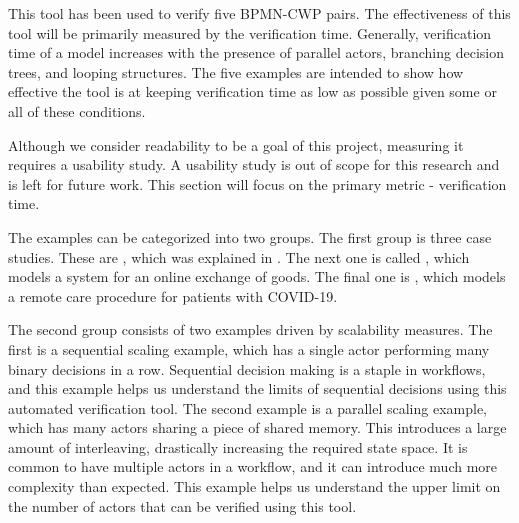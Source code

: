 This tool has been used to verify five BPMN-CWP pairs. The effectiveness of this tool will be primarily measured by the verification time. Generally, verification time of a model increases with the presence of parallel actors, branching decision trees, and looping structures. The five examples are intended to show how effective the tool is at keeping verification time as low as possible given some or all of these conditions.
 
Although we consider readability to be a goal of this project, measuring it requires a usability study. A usability study is out of scope for this research and is left for future work. This section will focus on the primary metric - verification time.

The examples can be categorized into two groups. The first group is three case studies. These are \facetoface, which was explained in . The next one is called \buynsell, which models a system for an online exchange of goods. The final one is \phware, which models a remote care procedure for patients with COVID-19.

The second group consists of two examples driven by scalability measures. The first is a sequential scaling example, which has a single actor performing many binary decisions in a row. Sequential decision making is a staple in workflows, and this example helps us understand the limits of sequential decisions using this automated verification tool. The second example is a parallel scaling example, which has many actors sharing a piece of shared memory. This introduces a large amount of interleaving, drastically increasing the required state space. It is common to have multiple actors in a workflow, and it can introduce much more complexity than expected. This example helps us understand the upper limit on the number of actors that can be verified using this tool.

